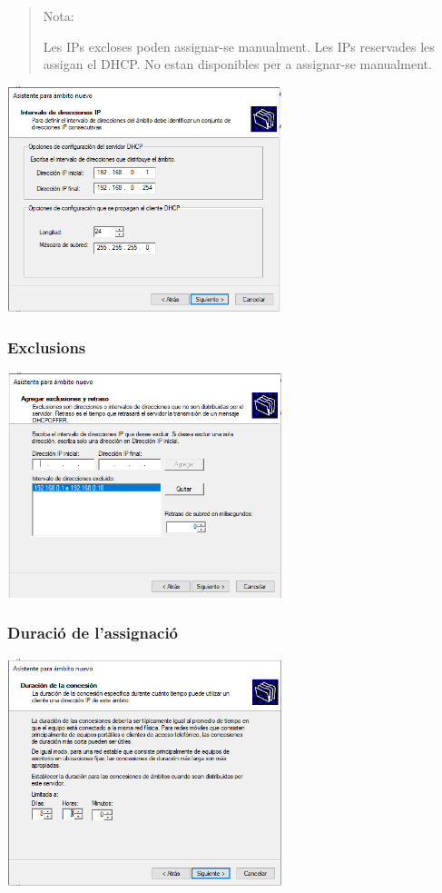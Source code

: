 \documentclass[
  a4paper,
]{article}
\begin{document}
\begin{quote}
Nota:

Les IPs excloses poden assignar-se manualment. Les IPs reservades les
assigan el DHCP. No estan disponibles per a assignar-se manualment.
\end{quote}

\includegraphics[width=0.6\textwidth,height=\textheight]{png/DHCP8.png}

\subsubsection{Exclusions}\label{exclusions}

\includegraphics[width=0.6\textwidth,height=\textheight]{png/DHCP9.png}

\subsubsection{Duració de
l'assignació}\label{duraciuxf3-de-lassignaciuxf3}

\includegraphics[width=0.6\textwidth,height=\textheight]{png/DHCP10.png}
\end{document}
